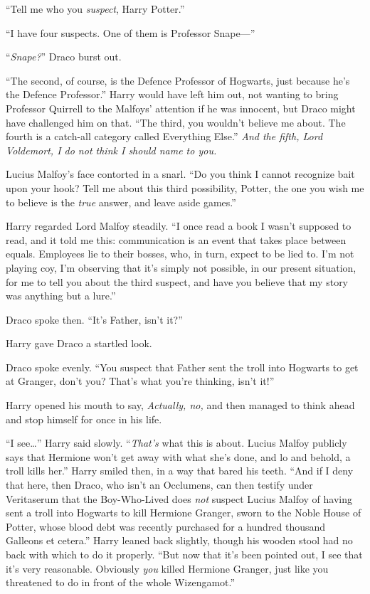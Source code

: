 “Tell me who you \emph{suspect}, Harry Potter.”

“I have four suspects. One of them is Professor Snape—”

“\emph{Snape?}” Draco burst out.

“The second, of course, is the Defence Professor of Hogwarts, just because he’s the Defence Professor.” Harry would have left him out, not wanting to bring Professor Quirrell to the Malfoys’ attention if he was innocent, but Draco might have challenged him on that. “The third, you wouldn’t believe me about. The fourth is a catch-all category called Everything Else.” \emph{And the fifth, Lord Voldemort, I do not think I should name to you.}

Lucius Malfoy’s face contorted in a snarl. “Do you think I cannot recognize bait upon your hook? Tell me about this third possibility, Potter, the one you wish me to believe is the \emph{true} answer, and leave aside games.”

Harry regarded Lord Malfoy steadily. “I once read a book I wasn’t supposed to read, and it told me this: communication is an event that takes place between equals. Employees lie to their bosses, who, in turn, expect to be lied to. I’m not playing coy, I’m observing that it’s simply not possible, in our present situation, for me to tell you about the third suspect, and have you believe that my story was anything but a lure.”

Draco spoke then. “It’s Father, isn’t it?”

Harry gave Draco a startled look.

Draco spoke evenly. “You suspect that Father sent the troll into Hogwarts to get at Granger, don’t you? That’s what you’re thinking, isn’t it!”

Harry opened his mouth to say, \emph{Actually, no,} and then managed to think ahead and stop himself for once in his life.

“I see…” Harry said slowly. “\emph{That’s} what this is about. Lucius Malfoy publicly says that Hermione won’t get away with what she’s done, and lo and behold, a troll kills her.” Harry smiled then, in a way that bared his teeth. “And if I deny that here, then Draco, who isn’t an Occlumens, can then testify under Veritaserum that the Boy-Who-Lived does \emph{not} suspect Lucius Malfoy of having sent a troll into Hogwarts to kill Hermione Granger, sworn to the Noble House of Potter, whose blood debt was recently purchased for a hundred thousand Galleons et cetera.” Harry leaned back slightly, though his wooden stool had no back with which to do it properly. “But now that it’s been pointed out, I see that it’s very reasonable. Obviously \emph{you} killed Hermione Granger, just like you threatened to do in front of the whole Wizengamot.”

